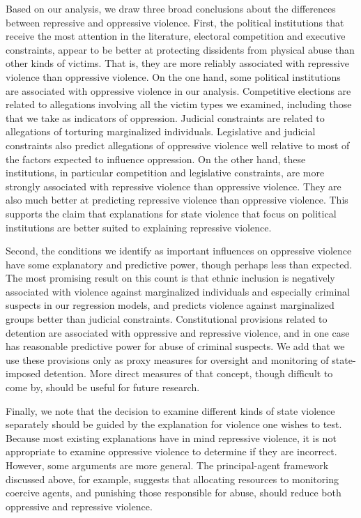 \documentclass[11pt]{article}
\begin{document}
Based on our analysis, we draw three broad conclusions about the differences between repressive and oppressive violence. First, the political institutions that receive the most attention in the literature, electoral competition and executive constraints, appear to be better at protecting dissidents from physical abuse than other kinds of victims. That is, they are more reliably associated with repressive violence than oppressive violence. On the one hand, some political institutions are associated with oppressive violence in our analysis. Competitive elections are related to allegations involving all the victim types we examined, including those that we take as indicators of oppression. Judicial constraints are related to allegations of torturing marginalized individuals. Legislative and judicial constraints also predict allegations of oppressive violence well relative to most of the factors expected to influence oppression. On the other hand, these institutions, in particular competition and legislative constraints, are more strongly associated with repressive violence than oppressive violence. They are also much better at predicting repressive violence than oppressive violence. This supports the claim that explanations for state violence that focus on political institutions are better suited to explaining repressive violence. 

Second, the conditions we identify as important influences on oppressive violence have some explanatory and predictive power, though perhaps less than expected. The most promising result on this count is that ethnic inclusion is negatively associated with violence against marginalized individuals and especially criminal suspects in our regression models, and predicts violence against marginalized groups better than judicial constraints. Constitutional provisions related to detention are associated with oppressive and repressive violence, and in one case has reasonable predictive power for abuse of criminal suspects. We add that we use these provisions only as proxy measures for oversight and monitoring of state-imposed detention. More direct measures of that concept, though difficult to come by, should be useful for future research.     

Finally, we note that the decision to examine different kinds of state violence separately should be guided by the explanation for violence one wishes to test. Because most existing explanations have in mind repressive violence, it is not appropriate to examine oppressive violence to determine if they are incorrect. However, some arguments are more general. The principal-agent framework discussed above, for example, suggests that allocating resources to monitoring coercive agents, and punishing those responsible for abuse, should reduce both oppressive and repressive violence.   
\end{document}
